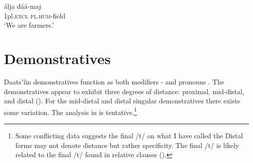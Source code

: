 \documentclass[output=paper]{langsci/langscibook}
\begin{document}
\ex\label{ex:ahlandc:55b}
\gll
álja             dáá-maj \\
  1pl\textsc{.excl}   \textsc{pl.hum}{}-field\\
  \glt
  ‘We are farmers.’
\z 
\z


\begin{table}
\caption{Pronominal NN constructions with derived nouns}
\label{tab:ahlandc:10}
\end{table}

\section{Demonstratives}\label{sec:ahlandc:9}

Daatsʼíin demonstratives function as both modifiers - and pronouns . The demonstratives appear to exhibit three degrees of distance: proximal, mid-distal, and distal (). For the mid-distal and distal singular demonstratives there exists some variation. The analysis in  is tentative.\footnote{Some conflicting data suggests the final /t/ on what I have called the Distal forms may not denote distance but rather specificity. The final /t/ is likely related to the final /t/ found in relative clauses ().}
\end{document}
